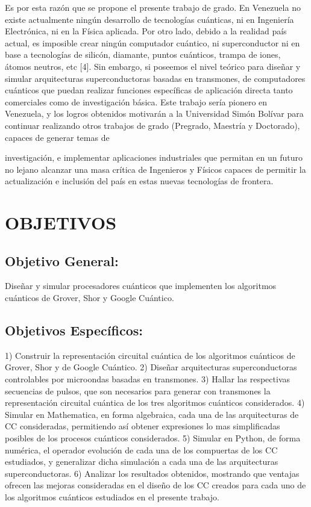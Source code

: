 Es por esta razón que se propone el presente trabajo de grado. En Venezuela no existe actualmente ningún desarrollo de tecnologías cuánticas, ni en Ingeniería Electrónica, ni en la Física aplicada. Por otro lado, debido a la realidad país actual, es imposible crear ningún computador cuántico, ni superconductor ni en base a tecnologías de silicón, diamante, puntos cuánticos, trampa de iones, átomos neutros, etc [4]. Sin embargo, si poseemos el nivel teórico para diseñar y simular arquitecturas superconductoras basadas en transmones, de computadores cuánticos que puedan realizar funciones específicas de aplicación directa tanto comerciales como de investigación básica.  Este trabajo sería pionero en Venezuela, y los logros obtenidos motivarán a la Universidad Simón Bolívar para continuar realizando otros trabajos de grado (Pregrado, Maestría y Doctorado), capaces de generar temas de

investigación, e implementar aplicaciones industriales que permitan en un futuro no lejano alcanzar una masa crítica de Ingenieros y Físicos capaces de permitir la actualización e inclusión del país en estas nuevas tecnologías de frontera.

\section{OBJETIVOS}

\subsection{Objetivo General:}

Diseñar y simular procesadores cuánticos que implementen los algoritmos cuánticos de Grover, Shor y Google Cuántico.

\subsection{Objetivos Específicos:}

1) Construir la representación circuital cuántica de los algoritmos cuánticos de Grover, Shor y de Google Cuántico.
2) Diseñar arquitecturas superconductoras controlables por microondas basadas en transmones.
3) Hallar las respectivas secuencias de pulsos, que son necesarios para generar con transmones la
representación circuital cuántica de los tres algoritmos cuánticos considerados.
4) Simular en Mathematica, en forma algebraica, cada una de las arquitecturas de CC consideradas,
permitiendo así obtener expresiones lo mas simplificadas posibles de los procesos cuánticos considerados.
5) Simular en Python, de forma numérica, el operador evolución de cada una de los compuertas de los CC
estudiados, y generalizar dicha simulación a cada una de las arquitecturas superconductoras.
6) Analizar los resultados obtenidos, mostrando que ventajas ofrecen las mejoras consideradas en el
diseño de los CC creados para cada uno de los algoritmos cuánticos estudiados en el presente trabajo.

